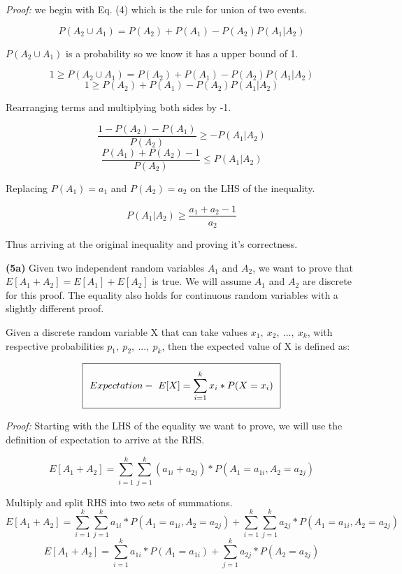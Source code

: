 \documentclass[11pt]{article}
\renewcommand\part[1]{\vspace{.10in}\textbf{(#1)}}
\begin{document}
\textit{Proof:} we begin with Eq. (4) which is the rule for union of two events.

$$P(A_2 \cup A_1) = P(A_2) + P(A_1) - P(A_2)P(A_1 | A_2)$$

$P(A_2 \cup A_1)$ is a probability so we know it has a upper bound of 1.

$$1 \geq P(A_2 \cup A_1) = P(A_2) + P(A_1) - P(A_2)P(A_1 | A_2)$$
$$1 \geq P(A_2) + P(A_1) - P(A_2)P(A_1 | A_2)$$

Rearranging terms and multiplying both sides by -1.

$$\frac{1 - P(A_2) - P(A_1)}{P(A_2)} \geq -P(A_1 | A_2)$$
$$\frac{P(A_1) + P(A_2) - 1}{P(A_2)} \leq P(A_1 | A_2)$$

Replacing $P(A_1) = a_1$ and $P(A_2) = a_2$ on the LHS of the inequality.

$$P(A_1 | A_2) \geq \frac{a_1 + a_2 - 1}{a_2}$$

Thus arriving at the original inequality and proving it's correctness.

\part{5a} Given two independent random variables $A_1$ and $A_2$, we want to prove that $E[A_1 + A_2] = E[A_1] + E[A_2]$ is true. We will assume $A_1$ and $A_2$ are discrete for this proof. The equality also holds for continuous random variables with a slightly different proof.

Given a discrete random variable X that can take values $x_1, \ x_2, \ ..., \ x_k$, with respective probabilities $p_1, \ p_2, \ ..., \ p_k$, then the expected value of X is defined as:

\begin{equation}
\setlength\fboxsep{0.25cm}
\setlength\fboxrule{0.4pt}
\boxed{Expectation- \ E[X] = \sum_{i = 1}^k x_i * P(X = x_i)}
\end{equation} 

\textit{Proof:} Starting with the LHS of the equality we want to prove, we will use the definition of expectation to arrive at the RHS.

$$E[A_1 + A_2] = \sum_{i = 1}^k \sum_{j = 1}^k (a_{1i} + a_{2j}) * P(A_1 = a_{1i}, A_2 = a_{2j})$$

Multiply and split RHS into two sets of summations.
$$E[A_1 + A_2] = \sum_{i = 1}^k \sum_{j = 1}^k a_{1i} * P(A_1 = a_{1i}, A_2 = a_{2j})  + \sum_{i = 1}^k \sum_{j = 1}^k a_{2j} * P(A_1 = a_{1i}, A_2 = a_{2j})$$
$$E[A_1 + A_2] = \sum_{i = 1}^k a_{1i} * P(A_1 = a_{1i})  + \sum_{j = 1}^k a_{2j} * P(A_2 = a_{2j})$$
\end{document}
